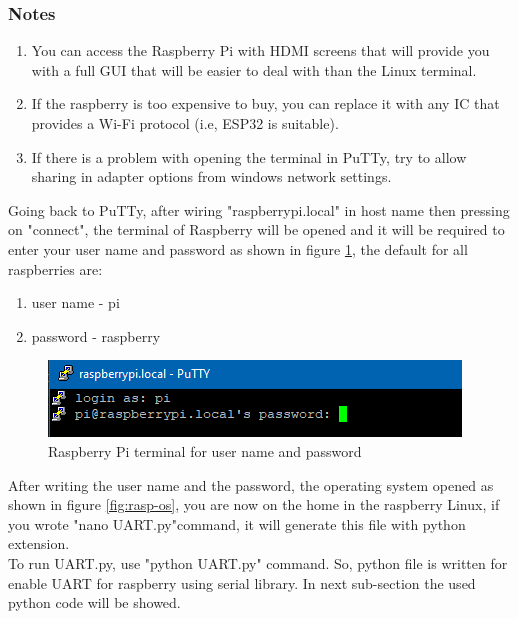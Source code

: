 \subsubsection{Notes}
\begin{enumerate}
    \item You can access the Raspberry Pi with HDMI screens that will provide you with a full GUI that will be easier to deal with than the Linux terminal.
    \item If the raspberry is too expensive to buy, you can replace it with any IC that provides a Wi-Fi protocol (i.e, ESP32 is suitable).
    \item If there is a problem with opening the terminal in PuTTy, try to allow sharing in adapter options from windows network settings.
\end{enumerate}

Going back to PuTTy, after wiring "raspberrypi.local" in host name then  pressing on "connect", the terminal of Raspberry will be opened and it will be required to enter your user name and password as shown in figure \ref{fig:rasp-terminal}, the default for all raspberries are:
\begin{enumerate}
    \item user name -  pi
    \item password  -  raspberry
\end{enumerate}

    
\begin{figure}[h]
    \centering
    \includegraphics[width = \textwidth]{figure/5_17.PNG}
    \caption{Raspberry Pi terminal for user name and password}
    \label{fig:rasp-terminal}
    \end{figure}
\newpage 

After writing the user name and the password, the operating system opened as shown in figure \ref{fig:rasp-os}, you are now on the home in the raspberry Linux, if you wrote "nano UART.py"command, it will generate this file with python extension. \\
To run UART.py, use "python UART.py" command.
So, python file is written for enable UART for raspberry using serial library. In next sub-section the used python code will be showed.

